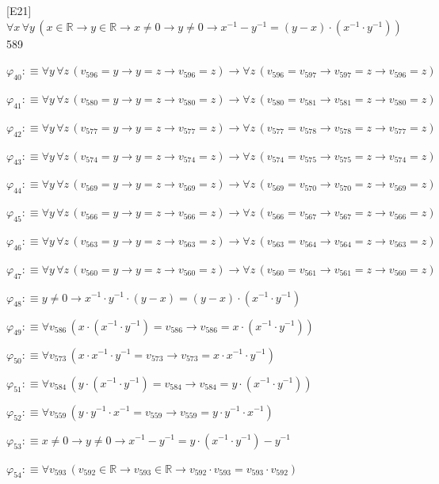 \begin{fullproof}{[E21]}{$\forall x\,\forall y\,(x \in \mathbb{R} \to y \in \mathbb{R} \to x \neq 0 \to y \neq 0 \to x^{-1} - y^{-1} = (y - x) \cdot (x^{-1} \cdot y^{-1}))$}{589}
\begin{abbrevlist}
\item $\varphi_{40} :\equiv \forall y\,\forall z\,(v_{596} = y \to y = z \to v_{596} = z) \to \forall z\,(v_{596} = v_{597} \to v_{597} = z \to v_{596} = z)$
\item $\varphi_{41} :\equiv \forall y\,\forall z\,(v_{580} = y \to y = z \to v_{580} = z) \to \forall z\,(v_{580} = v_{581} \to v_{581} = z \to v_{580} = z)$
\item $\varphi_{42} :\equiv \forall y\,\forall z\,(v_{577} = y \to y = z \to v_{577} = z) \to \forall z\,(v_{577} = v_{578} \to v_{578} = z \to v_{577} = z)$
\item $\varphi_{43} :\equiv \forall y\,\forall z\,(v_{574} = y \to y = z \to v_{574} = z) \to \forall z\,(v_{574} = v_{575} \to v_{575} = z \to v_{574} = z)$
\item $\varphi_{44} :\equiv \forall y\,\forall z\,(v_{569} = y \to y = z \to v_{569} = z) \to \forall z\,(v_{569} = v_{570} \to v_{570} = z \to v_{569} = z)$
\item $\varphi_{45} :\equiv \forall y\,\forall z\,(v_{566} = y \to y = z \to v_{566} = z) \to \forall z\,(v_{566} = v_{567} \to v_{567} = z \to v_{566} = z)$
\item $\varphi_{46} :\equiv \forall y\,\forall z\,(v_{563} = y \to y = z \to v_{563} = z) \to \forall z\,(v_{563} = v_{564} \to v_{564} = z \to v_{563} = z)$
\item $\varphi_{47} :\equiv \forall y\,\forall z\,(v_{560} = y \to y = z \to v_{560} = z) \to \forall z\,(v_{560} = v_{561} \to v_{561} = z \to v_{560} = z)$
\item $\varphi_{48} :\equiv y \neq 0 \to x^{-1} \cdot y^{-1} \cdot (y - x) = (y - x) \cdot (x^{-1} \cdot y^{-1})$
\item $\varphi_{49} :\equiv \forall v_{586}\,(x \cdot (x^{-1} \cdot y^{-1}) = v_{586} \to v_{586} = x \cdot (x^{-1} \cdot y^{-1}))$
\item $\varphi_{50} :\equiv \forall v_{573}\,(x \cdot x^{-1} \cdot y^{-1} = v_{573} \to v_{573} = x \cdot x^{-1} \cdot y^{-1})$
\item $\varphi_{51} :\equiv \forall v_{584}\,(y \cdot (x^{-1} \cdot y^{-1}) = v_{584} \to v_{584} = y \cdot (x^{-1} \cdot y^{-1}))$
\item $\varphi_{52} :\equiv \forall v_{559}\,(y \cdot y^{-1} \cdot x^{-1} = v_{559} \to v_{559} = y \cdot y^{-1} \cdot x^{-1})$
\item $\varphi_{53} :\equiv x \neq 0 \to y \neq 0 \to x^{-1} - y^{-1} = y \cdot (x^{-1} \cdot y^{-1}) - y^{-1}$
\item $\varphi_{54} :\equiv \forall v_{593}\,(v_{592} \in \mathbb{R} \to v_{593} \in \mathbb{R} \to v_{592} \cdot v_{593} = v_{593} \cdot v_{592})$

\end{abbrevlist}
\end{fullproof}
